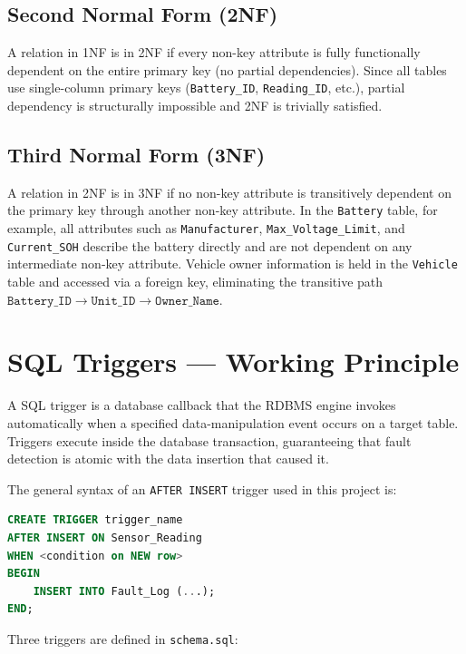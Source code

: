 \documentclass[12pt, a4paper]{report}
\begin{document}
\subsection{Second Normal Form (2NF)}
A relation in 1NF is in 2NF if every non-key attribute is fully functionally dependent on the entire primary key (no partial dependencies). Since all tables use single-column primary keys (\texttt{Battery\_ID}, \texttt{Reading\_ID}, etc.), partial dependency is structurally impossible and 2NF is trivially satisfied.

\subsection{Third Normal Form (3NF)}
A relation in 2NF is in 3NF if no non-key attribute is transitively dependent on the primary key through another non-key attribute. In the \texttt{Battery} table, for example, all attributes such as \texttt{Manufacturer}, \texttt{Max\_Voltage\_Limit}, and \texttt{Current\_SOH} describe the battery directly and are not dependent on any intermediate non-key attribute. Vehicle owner information is held in the \texttt{Vehicle} table and accessed via a foreign key, eliminating the transitive path $\texttt{Battery\_ID} \to \texttt{Unit\_ID} \to \texttt{Owner\_Name}$.

\section{SQL Triggers — Working Principle}
A SQL trigger is a database callback that the RDBMS engine invokes automatically when a specified data-manipulation event occurs on a target table. Triggers execute inside the database transaction, guaranteeing that fault detection is atomic with the data insertion that caused it.

The general syntax of an \texttt{AFTER INSERT} trigger used in this project is:

\begin{lstlisting}[language=SQL, caption={General trigger structure used in the BMS schema}]
CREATE TRIGGER trigger_name
AFTER INSERT ON Sensor_Reading
WHEN <condition on NEW row>
BEGIN
    INSERT INTO Fault_Log (...);
END;
\end{lstlisting}

Three triggers are defined in \texttt{schema.sql}:
\end{document}
